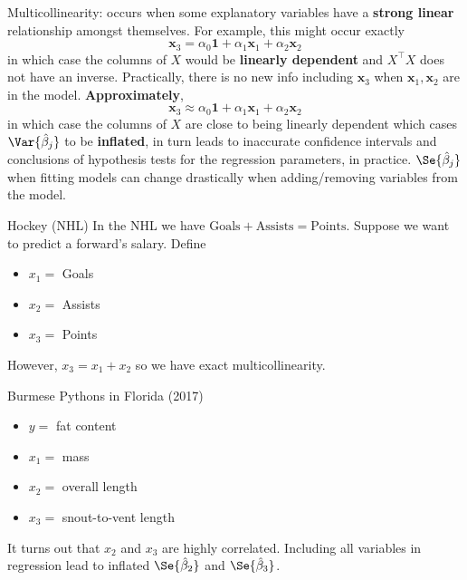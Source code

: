 Multicollinearity: occurs when some explanatory
variables have a \textbf{strong linear}
relationship amongst themselves. For example,
this might occur exactly
\[ \symbf{x}_3=\alpha_0\symbf{1}+\alpha_1\symbf{x}_1+\alpha_2\symbf{x}_2 \]
in which case the columns of $ X $ would be \textbf{linearly dependent}
and $ X^\top X $ does not have an inverse. Practically,
there is no new info including $ \symbf{x}_3 $
when $ \symbf{x}_1,\symbf{x}_2 $ are in the model.
\textbf{Approximately},
\[ \symbf{x}_3\approx \alpha_0\symbf{1}+\alpha_1\symbf{x}_1+\alpha_2\symbf{x}_2 \]
in which case the columns of $ X $ are close to being
linearly dependent which cases $ \Var{\hat{\beta}_j} $
to be \textbf{inflated}, in turn leads to inaccurate confidence
intervals and conclusions of hypothesis tests
for the regression parameters, in practice.
$ \Se{\hat{\beta}_j} $ when fitting models can change drastically
when adding/removing variables from the model.

\begin{Example}{Hockey (NHL)}{}
    In the NHL we have $ \text{Goals}+\text{Assists}=\text{Points} $.
    Suppose we want to predict a forward's salary. Define
    \begin{itemize}
        \item $ x_1= $ Goals
        \item $ x_2= $ Assists
        \item $ x_3= $ Points
    \end{itemize}
    However, $ x_3=x_1+x_2 $ so we have exact multicollinearity.
\end{Example}
\begin{Example}{Burmese Pythons in Florida (2017)}{}
    \begin{itemize}
        \item $ y= $ fat content
        \item $ x_1= $ mass
        \item $ x_2= $ overall length
        \item $ x_3= $ snout-to-vent length
    \end{itemize}
    It turns out that $ x_2 $ and $ x_3 $ are highly
    correlated. Including all variables in
    regression lead to inflated $ \Se{\hat{\beta}_2} $
    and $ \Se{\hat{\beta}_3} $.
\end{Example}

